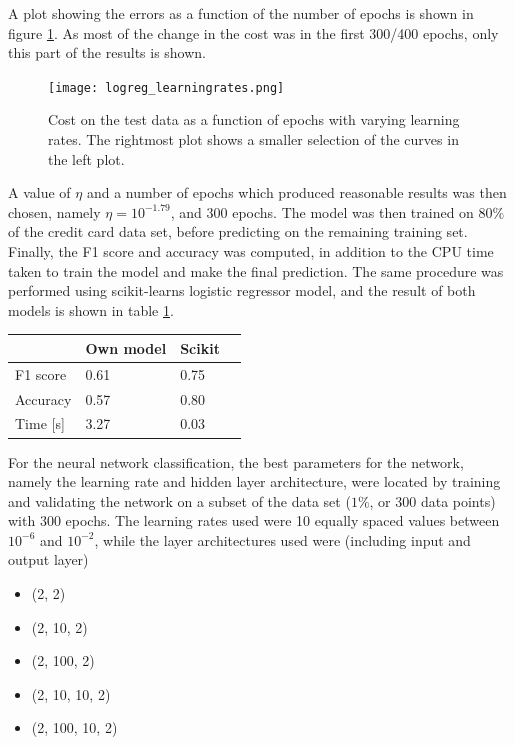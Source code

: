 \documentclass[a4paper,10pt,english]{article}
\begin{document}
A plot showing the errors as a function of the number of epochs is shown in figure \ref{fig:logreg_etas_plot}. As most of the change in the cost was in the first 300/400 epochs, only this part of the results is shown.

\begin{figure}
    \centering
    \texttt{[image: logreg\_learningrates.png]}
    \caption{Cost on the test data as a function of epochs with varying learning rates. The rightmost plot shows a smaller selection of the curves in the left plot.}
    \label{fig:logreg_etas_plot}
\end{figure}

A value of $\eta$ and a number of epochs which produced reasonable results was then chosen, namely $\eta = 10^{-1.79}$, and $300$ epochs. The model was then trained on $80\%$ of the credit card data set, before predicting on the remaining training set. Finally, the F1 score and accuracy was computed, in addition to the CPU time taken to train the model and make the final prediction. The same procedure was performed using scikit-learns logistic regressor model, and the result of both models is shown in table \ref{tab:logreg_own_scikit}.

\begin{table}[] \centering
\begin{tabular}{|l|l|l|l}
\hline
         & Own model & Scikit \\ \hline
F1 score & 0.61      & 0.75   \\ \hline
Accuracy & 0.57      & 0.80   \\ \hline
Time [s] & 3.27 & 0.03 \\ \hline
\end{tabular}
\label{tab:logreg_own_scikit}
\end{table}

For the neural network classification, the best parameters for the network, namely the learning rate and hidden layer architecture, were located by training and validating the network on a subset of the data set ($1\%$, or 300 data points) with 300 epochs. The learning rates used were 10 equally spaced values between $10^{-6}$ and $10^{-2}$, while the layer architectures used were (including input and output layer)

\begin{itemize}
    \item (2, 2)
    \item (2, 10, 2)
    \item (2, 100, 2)
    \item (2, 10, 10, 2)
    \item (2, 100, 10, 2)
\end{itemize}
\end{document}
